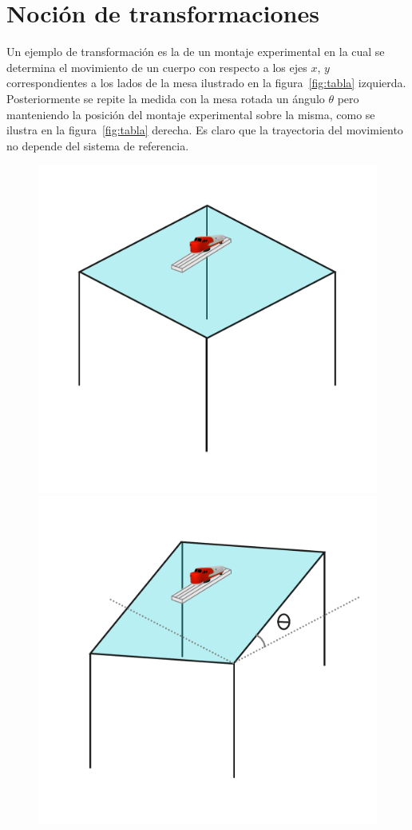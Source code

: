 \documentclass[11pt,a4paper]{article}
\begin{document}
\section{Noción de transformaciones}

Un ejemplo de transformación es la de un montaje experimental en la cual se determina el movimiento de un cuerpo con respecto a los ejes $x$, $y$ correspondientes a los lados de la mesa ilustrado en la figura~\ref{fig:tabla} izquierda. Posteriormente se repite la medida con la mesa rotada un ángulo $\theta$ pero manteniendo la posición del montaje experimental sobre la misma, como se ilustra en la figura~\ref{fig:tabla} derecha. Es claro que la trayectoria del movimiento no depende del sistema de referencia.
\begin{figure}
  \centering
  \includegraphics[scale=0.4]{table}
  \includegraphics[scale=0.4]{tabletheta}

\end{figure}
\end{document}
